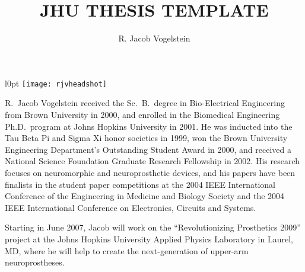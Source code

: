 \documentclass[12pt,oneside,final]{thesis}
\begin{document}
\title{JHU THESIS TEMPLATE}
\author{R. Jacob Vogelstein}
\dissertation
\doctorphilosophy
\copyrightnotice











\begin{vita}

\begin{wrapfigure}{l}{0pt}
\texttt{[image: rjvheadshot]}
\end{wrapfigure}

R.\ Jacob Vogelstein received the Sc.\ B.\ degree in Bio-Electrical Engineering 
from Brown University in 2000,  and enrolled in the Biomedical Engineering 
Ph.D.\ program at Johns Hopkins University in 2001.  He was inducted into the 
Tau Beta Pi and Sigma Xi honor societies in 1999, won the Brown University 
Engineering Department's Outstanding Student Award in 2000, and received a 
National Science Foundation Graduate Research Fellowship in 2002.  His research 
focuses on neuromorphic and neuroprosthetic devices, and his papers have been 
finalists in the student paper competitions at the 2004 IEEE International 
Conference of the Engineering in Medicine and Biology Society and the 2004 IEEE 
International Conference on Electronics, Circuits and Systems.

Starting in June 2007, Jacob will work on the ``Revolutionizing Prosthetics 2009'' 
project at the Johns Hopkins University Applied Physics Laboratory in Laurel,
MD, where he will help to create the next-generation of upper-arm
neuroprostheses.  

\end{vita}
\end{document}

